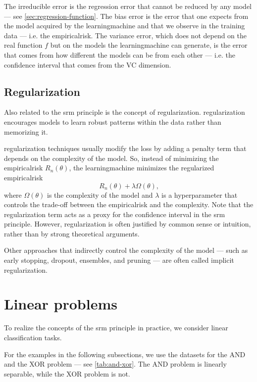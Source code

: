 The irreducible error is the regression error that cannot be reduced by any model --- see
\cref{sec:regression-function}.  The bias error is the error that one expects from the
model acquired by the \gls{learningmachine} and that we observe in the training data --- i.e.
the \gls{empiricalrisk}.  The variance error, which does not depend on the real function $f$
but on the models the \gls{learningmachine} can generate, is the error that comes from how
different the models can be from each other --- i.e. the confidence interval that comes from
the VC dimension.

\subsection{Regularization}

Also related to the \gls{srm} principle is the concept of \gls{regularization}.
\Gls{regularization} encourages models to learn robust patterns within the data rather than
memorizing it.

\Gls{regularization} techniques usually modify the \gls{loss} by adding a penalty term that
depends on the complexity of the model.  So, instead of minimizing the \gls{empiricalrisk}
$R_n(\theta)$, the \gls{learningmachine} minimizes the regularized \gls{empiricalrisk}
\[
  R_n(\theta) + \lambda \Omega(\theta)\text{,}
\]
where $\Omega(\theta)$ is the complexity of the model and $\lambda$ is a hyperparameter
that controls the trade-off between the \gls{empiricalrisk} and the complexity.
Note that the \gls{regularization} term acts as a proxy for the confidence interval in the
\gls{srm} principle.  However, \gls{regularization} is often justified by common sense or
intuition, rather than by strong theoretical arguments.

Other approaches that indirectly control the complexity of the model --- such as early
stopping, dropout, ensembles, and pruning --- are often called implicit \gls{regularization}.

\section{Linear problems}

To realize the concepts of the \gls{srm} principle in practice, we consider linear
classification tasks.

For the examples in the following subsections, we use the datasets for the AND
and the XOR problem --- see \cref{tab:and-xor}.
The AND problem is linearly separable, while the XOR problem is not.

